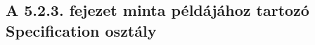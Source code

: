 \appendix
\chapter*{\fuggelek}
\setcounter{chapter}{\appendixnumber}

\section{A 5.2.3. fejezet minta példájához tartozó Specification osztály}
